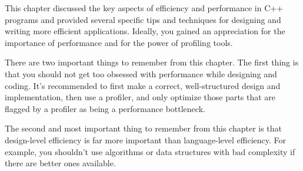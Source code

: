 This chapter discussed the key aspects of efficiency and performance in C++ programs and provided several specific tips and techniques for designing and writing more efficient applications. Ideally, you gained an appreciation for the importance of performance and for the power of profiling tools.

There are two important things to remember from this chapter. The first thing is that you should not get too obsessed with performance while designing and coding. It’s recommended to first make a correct, well-structured design and implementation, then use a profiler, and only optimize those parts that are flagged by a profiler as being a performance bottleneck.

The second and most important thing to remember from this chapter is that design-level efficiency is far more important than language-level efficiency. For example, you shouldn’t use algorithms or data structures with bad complexity if there are better ones available.